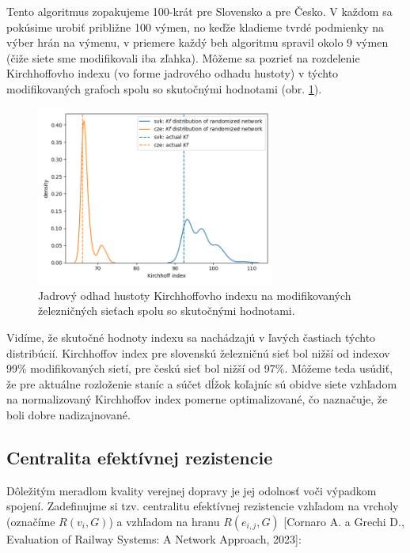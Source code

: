 \documentclass[main.tex]{subfiles}
\begin{document}
Tento algoritmus zopakujeme 100-krát pre Slovensko a pre Česko. V každom sa pokúsime urobiť približne 100 výmen, no keďže kladieme tvrdé podmienky na výber hrán na výmenu, v priemere každý beh algoritmu spravil okolo 9 výmen (čiže siete sme modifikovali iba zľahka). Môžeme sa pozrieť na rozdelenie Kirchhoffovho indexu (vo forme jadrového odhadu hustoty) v týchto modifikovaných grafoch spolu so skutočnými hodnotami (obr. \ref{fig:kirchhoff_random_networks}).

\begin{figure}
	\centering
	\includegraphics[width=0.7\textwidth]{images/kde_kirchhoff_randomized.png}
	\caption{Jadrový odhad hustoty Kirchhoffovho indexu na modifikovaných železničných sieťach spolu so skutočnými hodnotami.}
	\label{fig:kirchhoff_random_networks}
\end{figure}

Vidíme, že skutočné hodnoty indexu sa nachádzajú v ľavých častiach týchto distribúcií. Kirchhoffov index pre slovenskú železničnú sieť bol nižší od indexov 99\% modifikovaných sietí, pre českú sieť bol nižší od 97\%. Môžeme teda usúdiť, že pre aktuálne rozloženie staníc a súčet dĺžok koľajníc sú obidve siete vzhľadom na normalizovaný Kirchhoffov index pomerne optimalizované, čo naznačuje, že boli dobre nadizajnované. 

\subsection{Centralita efektívnej rezistencie}

Dôležitým meradlom kvality verejnej dopravy je jej odolnosť voči výpadkom spojení. Zadefinujme si tzv. centralitu efektívnej rezistencie vzhľadom na vrcholy (označíme $R(v_i, G)$) a vzhľadom na hranu $R(e_{i,j}, G)$ [Cornaro A. a Grechi D., Evaluation of Railway Systems: A Network Approach, 2023]:
\end{document}
